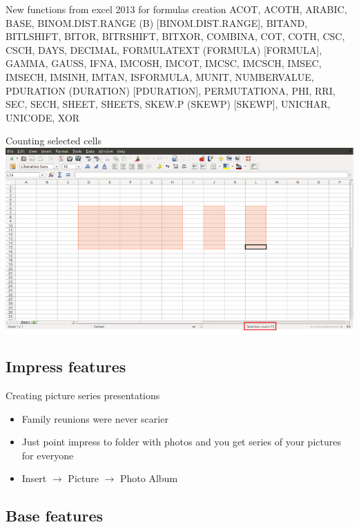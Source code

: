 \documentclass{beamer}
\begin{document}
\begin{frame}[t]{New functions from excel 2013 for formulas creation}
ACOT, ACOTH, ARABIC, BASE, BINOM.DIST.RANGE (B) [BINOM.DIST.RANGE], BITAND, BITLSHIFT, BITOR, BITRSHIFT, BITXOR, COMBINA, COT, COTH, CSC, CSCH, DAYS, DECIMAL, FORMULATEXT (FORMULA) [FORMULA], GAMMA, GAUSS, IFNA, IMCOSH, IMCOT, IMCSC, IMCSCH, IMSEC, IMSECH, IMSINH, IMTAN, ISFORMULA, MUNIT, NUMBERVALUE, PDURATION (DURATION) [PDURATION], PERMUTATIONA, PHI, RRI, SEC, SECH, SHEET, SHEETS, SKEW.P (SKEWP) [SKEWP], UNICHAR, UNICODE, XOR
\end{frame}

\begin{frame}{Counting selected cells}
	\includegraphics[width= 1.0\linewidth]{cells-selection-count-calc.png}
\end{frame}


\subsection{Impress features}

\begin{frame}[t]{Creating picture series presentations}
	\begin{itemize}
	\item Family reunions were never scarier
	\item Just point impress to folder with photos and you get series of your pictures for everyone
	\item Insert $\rightarrow$ Picture $\rightarrow$ Photo Album
	\end{itemize}

\end{frame}

\subsection{Base features}
\end{document}
